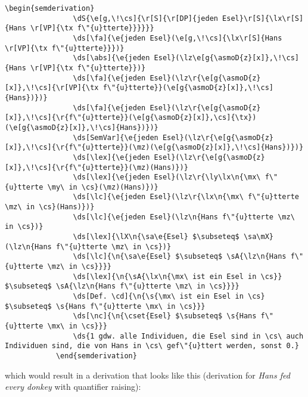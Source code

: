 \documentclass[10pt, a4paper]{article}
\begin{document}
	\begin{lstlisting}[style=B]
			\begin{semderivation}
				\dS{\e[g,\!\cs]{\r[S]{\r[DP]{jeden Esel}\r[S]{\lx\r[S]{Hans \r[VP]{\tx f\"{u}tterte}}}}}}
				\ds[\fa]{\e{jeden Esel}(\e[g,\!\cs]{\lx\r[S]{Hans \r[VP]{\tx f\"{u}tterte}}})}
				\ds[\abs]{\e{jeden Esel}(\lz\e[g{\asmoD{z}[x]},\!\cs]{Hans \r[VP]{\tx f\"{u}tterte}})}
				\ds[\fa]{\e{jeden Esel}(\lz\r{\e[g{\asmoD{z}[x]},\!\cs]{\r[VP]{\tx f\"{u}tterte}}(\e[g{\asmoD{z}[x]},\!\cs]{Hans})})}
				\ds[\fa]{\e{jeden Esel}(\lz\r{\e[g{\asmoD{z}[x]},\!\cs]{\r{f\"{u}tterte}}(\e[g{\asmoD{z}[x]},\cs]{\tx})(\e[g{\asmoD{z}[x]},\!\cs]{Hans})})}
				\ds[SemVar]{\e{jeden Esel}(\lz\r{\e[g{\asmoD{z}[x]},\!\cs]{\r{f\"{u}tterte}}(\mz)(\e[g{\asmoD{z}[x]},\!\cs]{Hans})})}
				\ds[\lex]{\e{jeden Esel}(\lz\r{\e[g{\asmoD{z}[x]},\!\cs]{\r{f\"{u}tterte}}(\mz)(Hans)})}
				\ds[\lex]{\e{jeden Esel}(\lz\r{\ly\lx\n{\mx\ f\"{u}tterte \my\ in \cs}(\mz)(Hans)})}
				\ds[\lc]{\e{jeden Esel}(\lz\r{\lx\n{\mx\ f\"{u}tterte \mz\ in \cs}(Hans)})}
				\ds[\lc]{\e{jeden Esel}(\lz\n{Hans f\"{u}tterte \mz\ in \cs})}
				\ds[\lex]{\lX\n{\sa\e{Esel} $\subseteq$ \sa\mX}(\lz\n{Hans f\"{u}tterte \mz\ in \cs})}
				\ds[\lc]{\n{\sa\e{Esel} $\subseteq$ \sA{\lz\n{Hans f\"{u}tterte \mz\ in \cs}}}}
				\ds[\lex]{\n{\sA{\lx\n{\mx\ ist ein Esel in \cs}} $\subseteq$ \sA{\lz\n{Hans f\"{u}tterte \mz\ in \cs}}}}
				\ds[Def. \cd]{\n{\s{\mx\ ist ein Esel in \cs} $\subseteq$ \s{Hans f\"{u}tterte \mx\ in \cs}}}
				\ds[\nc]{\n{\cset{Esel} $\subseteq$ \s{Hans f\"{u}tterte \mx\ in \cs}}}
				\ds{1 gdw. alle Individuen, die Esel sind in \cs\ auch Individuen sind, die von Hans in \cs\ gef\"{u}ttert werden, sonst 0.}
			\end{semderivation}
	\end{lstlisting}
	which would result in a derivation that looks like this (derivation for \textit{Hans fed every donkey} with quantifier raising):
\end{document}
